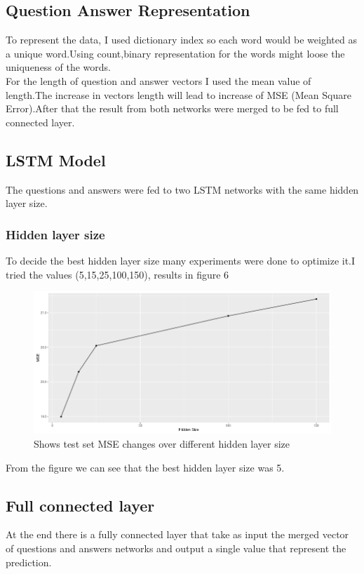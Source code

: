 \documentclass{article}
\begin{document}
\begin{multicols*}{2}
\begin{flushleft}
\subsection{Question Answer Representation}
To represent the data, I used dictionary index so  each word would be weighted as a unique word.Using count,binary representation for the words might loose the uniqueness of the words.\\
For the length of question and answer vectors I used the mean value of length.The increase in vectors length will lead to increase of MSE (Mean Square Error).After that the result from both networks were merged to be fed to full connected layer.
\subsection{LSTM Model}
The questions and answers were fed to two LSTM networks with the same hidden layer size.
\subsubsection{Hidden layer size}
To decide the best hidden layer size many experiments were done to optimize it.I tried the values (5,15,25,100,150), results in figure 6
\begin{figure}[H]
\includegraphics[scale=0.27]{hiddenSize.png}
\caption{Shows test set MSE changes over different hidden layer size}
\end{figure}
From the figure we can see that the best hidden layer size was 5. 
\subsection{Full connected layer}
At the end there is a fully connected layer that take as input the merged vector of questions and answers networks and output a single value that represent the prediction.

\end{flushleft}
\end{multicols*}
\end{document}

